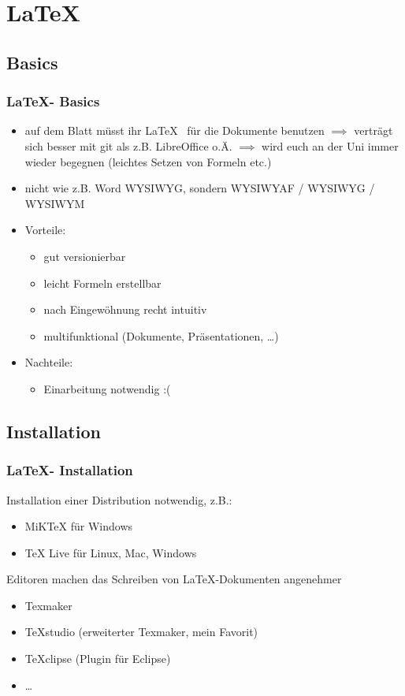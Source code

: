 \documentclass[18pt]{beamer}
\begin{document}
		
\section{\LaTeX}
	\subsection{Basics}
	\begin{frame}
		\frametitle{\LaTeX - Basics}
		\begin{itemize}
			\item auf dem Blatt müsst ihr \LaTeX  ~ für die Dokumente benutzen \linebreak $\implies$ verträgt sich besser mit git als z.B. LibreOffice o.Ä.
			\linebreak $\implies$ wird euch an der Uni immer wieder begegnen (leichtes Setzen von Formeln etc.)
			\item nicht wie z.B. Word WYSIWYG, sondern WYSIWYAF / WYSIWYG / WYSIWYM
			\item Vorteile:
			\begin{itemize}
				\item gut versionierbar
				\item leicht Formeln erstellbar
				\item nach Eingewöhnung recht intuitiv
				\item multifunktional (Dokumente, Präsentationen, \dots)
			\end{itemize}
			\item Nachteile:
			\begin{itemize}
				\item Einarbeitung notwendig :(
			\end{itemize}
		\end{itemize}
	\end{frame}
	
	\subsection{Installation}
	\begin{frame}
		\frametitle{\LaTeX - Installation}
		Installation einer Distribution notwendig, z.B.:
		\begin{itemize}
			\item  MiKTeX für Windows
			\item TeX Live für Linux, Mac, Windows
		\end{itemize}
		Editoren machen das Schreiben von \LaTeX -Dokumenten angenehmer
		\begin{itemize}
			\item Texmaker
			\item TeXstudio (erweiterter Texmaker, mein Favorit)
			\item TeXclipse (Plugin für Eclipse)
			\item \dots
		\end{itemize}
	\end{frame}
	
\end{document}
